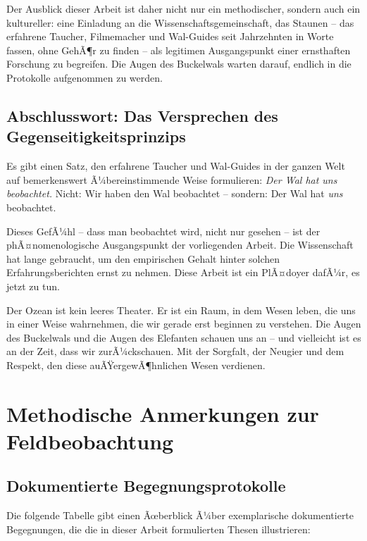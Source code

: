 ﻿\documentclass[12pt,a4paper]{article}
\theoremstyle{definition}
\theoremstyle{remark}
\begin{document}
Der Ausblick dieser Arbeit ist daher nicht nur ein methodischer, sondern auch ein kultureller: eine Einladung an die Wissenschaftsgemeinschaft, das Staunen -- das erfahrene Taucher, Filmemacher und Wal-Guides seit Jahrzehnten in Worte fassen, ohne GehÃ¶r zu finden -- als legitimen Ausgangspunkt einer ernsthaften Forschung zu begreifen. Die Augen des Buckelwals warten darauf, endlich in die Protokolle aufgenommen zu werden.

\subsection{Abschlusswort: Das Versprechen des Gegenseitigkeitsprinzips}

Es gibt einen Satz, den erfahrene Taucher und Wal-Guides in der ganzen Welt
auf bemerkenswert Ã¼bereinstimmende Weise formulieren: \emph{Der Wal hat uns
beobachtet.} Nicht: Wir haben den Wal beobachtet -- sondern: Der Wal
hat \emph{uns} beobachtet.

Dieses GefÃ¼hl -- dass man beobachtet wird, nicht nur gesehen -- ist der
phÃ¤nomenologische Ausgangspunkt der vorliegenden Arbeit. Die Wissenschaft hat
lange gebraucht, um den empirischen Gehalt hinter solchen Erfahrungsberichten
ernst zu nehmen. Diese Arbeit ist ein PlÃ¤doyer dafÃ¼r, es jetzt zu tun.

Der Ozean ist kein leeres Theater. Er ist ein Raum, in dem Wesen leben,
die uns in einer Weise wahrnehmen, die wir gerade erst beginnen zu verstehen.
Die Augen des Buckelwals und die Augen des Elefanten schauen uns an -- und
vielleicht ist es an der Zeit, dass wir zurÃ¼ckschauen. Mit der Sorgfalt,
der Neugier und dem Respekt, den diese auÃŸergewÃ¶hnlichen Wesen verdienen.

\appendix
\section{Methodische Anmerkungen zur Feldbeobachtung}

\subsection{Dokumentierte Begegnungsprotokolle}

Die folgende Tabelle gibt einen Ãœberblick Ã¼ber exemplarische dokumentierte
Begegnungen, die die in dieser Arbeit formulierten Thesen illustrieren:
\end{document}
